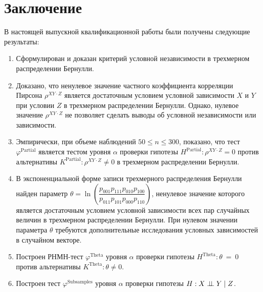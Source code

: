 \section*{Заключение}
В настоящей выпускной квалификационной работы 
были получены следующие результаты:
\begin{enumerate}
    \item Сформулирован и доказан критерий условной независимости
    в трехмерном распределении Бернулли.
    \item Доказано, что ненулевое значение
    частного коэффициента корреляции Пирсона 
    $\rho^{XY \cdot Z}$ является достаточным
    условием условной зависимости $X$ и $Y$ при 
    условии $Z$ в трехмерном распределении Бернулли.
    Однако, нулевое значение $\rho^{XY \cdot Z}$ не позволяет сделать выводы
    об условной независимости или зависимости.
    \item Эмпирически, при объеме наблюдений $50 \leq n \leq 300$,
    показано, что тест
    $\varphi^{\text{Partial}}$ является тестом уровня
    $\alpha$ проверки гипотезы $H^{\text{Partial}}: \rho^{XY\cdot Z}=0$ 
    против альтернативы $K^{\text{Partial}}: \rho^{XY\cdot Z}\neq 0$
    в трехмерном распределении
    Бернулли.
    \item В экспоненциальной форме записи трехмерного 
    распределения Бернулли найден параметр 
    $\theta = \ln  \left(\dfrac{p_{001}p_{111}p_{010}p_{100}}{p_{011}p_{101}p_{000}p_{110}}\right)$,
    ненулевое значение которого является достаточным 
    условием условной зависимости всех пар
    случайных величин в трехмерном распределении Бернулли.
    При нулевом значении параметра $\theta$ требуются дополнительные
    исследования условных зависимостей в случайном векторе.
    \item Построен РНМН-тест $\varphi^{\text{Theta}}$
    уровня $\alpha$ проверки гипотезы $H^{\text{Theta}}: \theta~=~0$
    против альтернативы $K^{\text{Theta}}: \theta\neq 0$.
    \item Построен тест $\varphi^{\text{Subsamples}}$ 
    уровня $\alpha$
    проверки гипотезы $H: X \perp\!\!\!\perp Y \mid Z$.
\end{enumerate}
